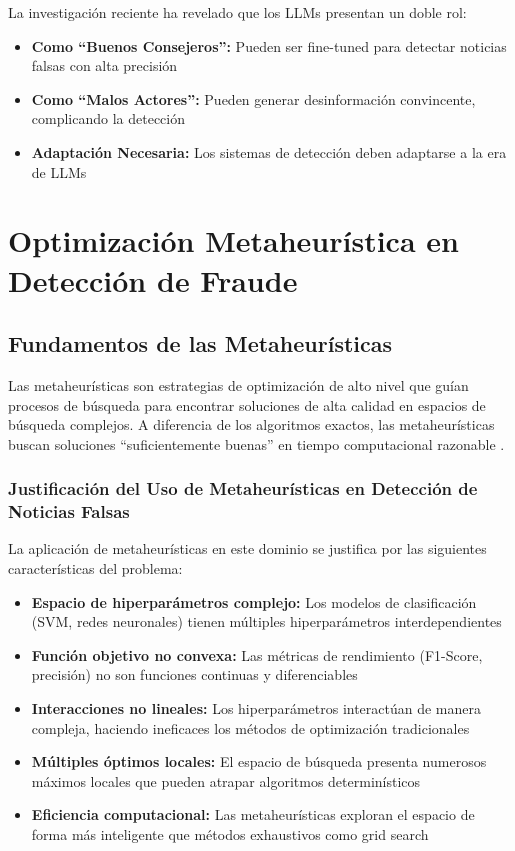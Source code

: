 La investigación reciente ha revelado que los LLMs presentan un doble rol:
\begin{itemize}
    \item \textbf{Como ``Buenos Consejeros'':} Pueden ser fine-tuned para detectar noticias falsas con alta precisión \cite{hu2024bad}
    \item \textbf{Como ``Malos Actores'':} Pueden generar desinformación convincente, complicando la detección \cite{su2023fake}
    \item \textbf{Adaptación Necesaria:} Los sistemas de detección deben adaptarse a la era de LLMs \cite{su2023adapting}
\end{itemize}

\section{Optimización Metaheurística en Detección de Fraude}
\label{sec:optimizacion_metaheuristica}

\subsection{Fundamentos de las Metaheurísticas}

Las metaheurísticas son estrategias de optimización de alto nivel que guían procesos de búsqueda para encontrar soluciones de alta calidad en espacios de búsqueda complejos. A diferencia de los algoritmos exactos, las metaheurísticas buscan soluciones ``suficientemente buenas'' en tiempo computacional razonable \cite{anselmo2013diseno}.

\subsubsection{Justificación del Uso de Metaheurísticas en Detección de Noticias Falsas}

La aplicación de metaheurísticas en este dominio se justifica por las siguientes características del problema:

\begin{itemize}
    \item \textbf{Espacio de hiperparámetros complejo:} Los modelos de clasificación (SVM, redes neuronales) tienen múltiples hiperparámetros interdependientes
    \item \textbf{Función objetivo no convexa:} Las métricas de rendimiento (F1-Score, precisión) no son funciones continuas y diferenciables
    \item \textbf{Interacciones no lineales:} Los hiperparámetros interactúan de manera compleja, haciendo ineficaces los métodos de optimización tradicionales
    \item \textbf{Múltiples óptimos locales:} El espacio de búsqueda presenta numerosos máximos locales que pueden atrapar algoritmos determinísticos
    \item \textbf{Eficiencia computacional:} Las metaheurísticas exploran el espacio de forma más inteligente que métodos exhaustivos como grid search
\end{itemize}

